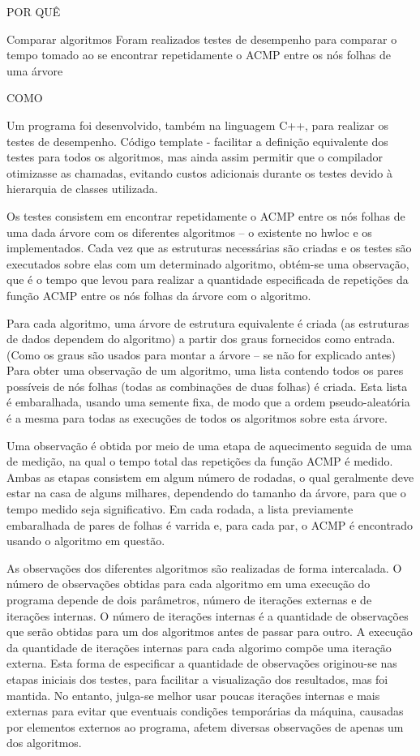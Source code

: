 

POR QUÊ

Comparar algoritmos
Foram realizados testes de desempenho para comparar o tempo tomado ao se encontrar repetidamente o ACMP entre os nós folhas de uma árvore

COMO

Um programa foi desenvolvido, também na linguagem C++, para realizar os testes de desempenho.
Código template - facilitar a definição equivalente dos testes para todos os algoritmos, mas ainda assim permitir que o compilador otimizasse as chamadas, evitando custos adicionais durante os testes devido à hierarquia de classes utilizada.

Os testes consistem em encontrar repetidamente o ACMP entre os nós folhas de uma dada árvore com os diferentes algoritmos -- o existente no hwloc e os implementados.
Cada vez que as estruturas necessárias são criadas e os testes são executados sobre elas com um determinado algoritmo, obtém-se uma observação, que é o tempo que levou para realizar a quantidade especificada de repetições da função ACMP entre os nós folhas da árvore com o algoritmo.

Para cada algoritmo, uma árvore de estrutura equivalente é criada (as estruturas de dados dependem do algoritmo) a partir dos graus fornecidos como entrada.
(Como os graus são usados para montar a árvore -- se não for explicado antes)
Para obter uma observação de um algoritmo, uma lista contendo todos os pares possíveis de nós folhas (todas as combinações de duas folhas) é criada.
Esta lista é embaralhada, usando uma semente fixa, de modo que a ordem pseudo-aleatória é a mesma para todas as execuções de todos os algoritmos sobre esta árvore.

Uma observação é obtida por meio de uma etapa de aquecimento seguida de uma de medição, na qual o tempo total das repetições da função ACMP é medido.
Ambas as etapas consistem em algum número de rodadas, o qual geralmente deve estar na casa de alguns milhares, dependendo do tamanho da árvore, para que o tempo medido seja significativo.
Em cada rodada, a lista previamente embaralhada de pares de folhas é varrida e, para cada par, o ACMP é encontrado usando o algoritmo em questão.

As observações dos diferentes algoritmos são realizadas de forma intercalada.
O número de observações obtidas para cada algoritmo em uma execução do programa depende de dois parâmetros, número de iterações externas e de iterações internas.
O número de iterações internas é a quantidade de observações que serão obtidas para um dos algoritmos antes de passar para outro.
A execução da quantidade de iterações internas para cada algorimo compõe uma iteração externa.
Esta forma de especificar a quantidade de observações originou-se nas etapas iniciais dos testes, para facilitar a visualização dos resultados, mas foi mantida.
No entanto, julga-se melhor usar poucas iterações internas e mais externas para evitar que eventuais condições temporárias da máquina, causadas por elementos externos ao programa, afetem diversas observações de apenas um dos algoritmos.


